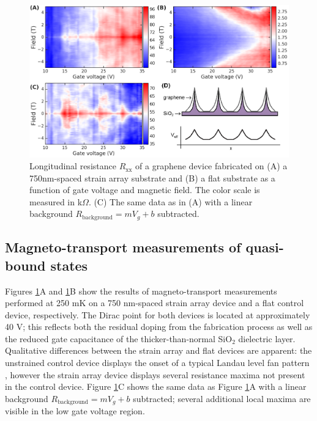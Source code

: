 \documentclass[edeposit,fullpage,draftthesis]{uiucthesis2009}
\begin{document}
            \begin{figure}
            \centering
            \includegraphics[width=\columnwidth]{images/resultsanddiscussion/strainarraypaper/Figure4_1}
            \caption[Magneto-transport measurements of graphene on strain array substrates]{
                Longitudinal resistance $R_\text{xx}$ of a graphene device fabricated on (A) a 750nm-spaced
                strain array substrate and (B) a flat substrate as a function of gate voltage and magnetic field. 
                The color scale is measured in k$\Omega$.
                (C) The same data as in (A) with a linear background $R_\text{background} = m V_g + b$ subtracted.
            }
            \label{'fig:transport'}
            \end{figure}
            
    \subsection{Magneto-transport measurements of quasi-bound states}
    \label{sec:sa_project}
            
            Figures \ref{'fig:transport'}A and \ref{'fig:transport'}B show the results of magneto-transport 
            measurements performed at 250 mK on a 750 nm-spaced strain array device and a flat control device, respectively.
            The Dirac point for both devices is located at approximately 40 V; this reflects both the residual doping
            from the fabrication process as well as the reduced gate capacitance of the thicker-than-normal SiO$_2$ dielectric layer.
            Qualitative differences between the strain array and flat devices are apparent: 
            the unstrained control device displays the onset of a typical Landau level fan pattern \cite{bolotin2009observation}, 
            however the strain array device displays several resistance maxima not present in the control device.
            Figure \ref{'fig:transport'}C shows the same data as Figure \ref{'fig:transport'}A with a linear background 
            $R_\text{background} = m V_g + b$ subtracted; several additional local maxima are visible in the low gate voltage region.
            
\end{document}
